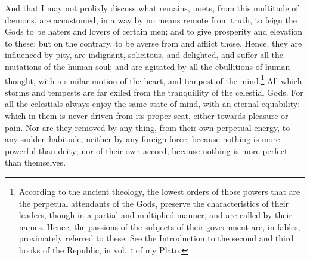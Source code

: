 \documentclass[12pt]{article}
\begin{document}
\noindent And that I may not prolixly discuss what remains, poets, from this
multitude of d{\ae}mons, are accustomed, in a way by no means remote from
truth, to feign the Gods to be haters and lovers of certain men; and to give
prosperity and elevation to these; but on the contrary, to be averse from and
afflict those. Hence, they are influenced by pity, are indignant, solicitous,
and delighted, and suffer all the mutations of the human soul; and are agitated
by all the ebullitions of human thought, with a similar motion of the heart,
and tempest of the mind.\footnote{According to the ancient theology, the lowest
orders of those powers that are the perpetual attendants of the Gods, preserve
the characteristics of their leaders, though in a partial and multiplied
manner, and are called by their names. Hence, the passions of the subjects of
their government are, in fables, proximately referred to these. See the
Introduction to the second and third books of the Republic, in
vol.~\textsc{i} of my Plato.} All which storms and tempests are far exiled
from the tranquillity of the celestial Gods. For all the celestials always
enjoy the same state of mind, with an eternal equability: which in them is
never driven from its proper seat, either towards pleasure or pain. Nor are
they removed by any thing, from their own perpetual energy, to any sudden
habitude; neither by any foreign force, because nothing is more powerful than
deity; nor of their own accord, because nothing is more perfect than
themselves.
\end{document}
